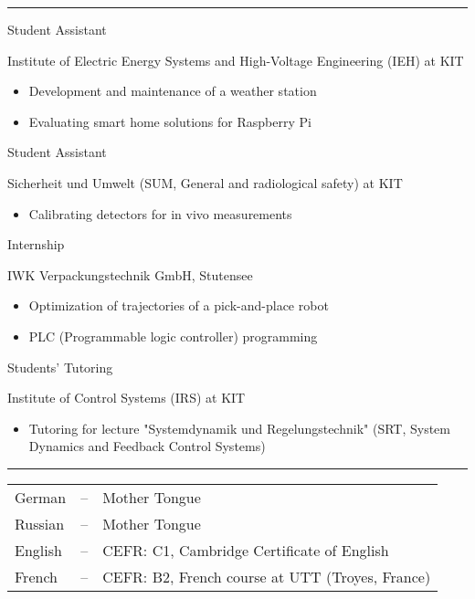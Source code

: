 \documentclass[a4paper,10pt]{article}
\newlength{\cvcolumngapwidth}
\newlength{\cvleftcolumnwidth}
\newlength{\cvrightcolumnwidth}
\newcommand{\cvsectionstyle}[1]{{\normalsize\textcolor{cvsectioncolor}{#1}}}
\newcommand{\cvtitlestyle}[1]{{\large\textcolor{cvtitlecolor}{#1}}}
\newcommand{\cvdurationstyle}[1]{{\small\textcolor{cvdurationcolor}{#1}}}
\newcommand{\cvheadingstyle}[1]{{\normalsize\textcolor{cvheadingcolor}{#1}}}
\newlength{\cvafteritemskipamount}
\newlength{\cvaftersectionskipamount}
\newlength{\cvbetweensectionandheadingextraskipamount}
\newlength{\cvaftertitleskipamount}
\newlength{\cvparskip}
\newcommand{\cvsection}[1]{
    \begin{minipage}[t][][b]{\cvleftcolumnwidth}
        \raggedleft\cvsectionstyle{#1}
    \end{minipage}%
    \hspace{\cvcolumngapwidth}%
    \begin{minipage}[t]{\cvrightcolumnwidth}
        \textcolor{cvrulecolor}{\rule{\cvrightcolumnwidth}{0.3mm}}
    \end{minipage}

    \vspace{\cvaftersectionskipamount}
}
\newcommand{\cvitem}[2]{
    \begin{minipage}[t]{\cvleftcolumnwidth}
    \strut\vspace*{-\baselineskip}\newline %
    \raggedleft #1
    \end{minipage}%
    \hspace{\cvcolumngapwidth}%
    \begin{minipage}[t]{\cvrightcolumnwidth}
        \setlength{\parskip}{\cvparskip}
        \strut\vspace*{-\baselineskip}\newline #2 %
    \end{minipage}

    \vspace{\cvafteritemskipamount}
}
\newcommand{\cvtitle}[1]{
    \cvtitlestyle{#1}

    \vspace{\cvaftertitleskipamount}
    \vspace{-\cvparskip}
}
\begin{document}
\cvsection{WORK EXPERIENCE}

\cvitem{\cvdurationstyle{May 2017 -- now}}{\cvtitle{Student Assistant}
    Institute of Electric Energy Systems and High-Voltage Engineering (IEH) at KIT
    \begin{itemize}[leftmargin=*]
        \item Development and maintenance of a weather station
        \item Evaluating smart home solutions for Raspberry Pi
    \end{itemize}
}

\cvitem{\cvdurationstyle{October 2018 -- December 2019}}{\cvtitle{Student Assistant}
	Sicherheit und Umwelt (SUM, General and radiological safety) at KIT
	\begin{itemize}[leftmargin=*]
		\item Calibrating detectors for in vivo measurements
	\end{itemize}
}

\cvitem{\cvdurationstyle{April 2018 -- July 2018}}{\cvtitle{Internship}
    IWK Verpackungstechnik GmbH, Stutensee
    \begin{itemize}[leftmargin=*]
        \item Optimization of trajectories of a pick-and-place robot
        \item PLC (Programmable logic controller) programming
    \end{itemize}
}

\cvitem{\cvdurationstyle{April 2018 -- July 2018}}{\cvtitle{Students' Tutoring}
    Institute of Control Systems (IRS) at KIT
    \begin{itemize}[leftmargin=*]
        \item Tutoring for lecture "Systemdynamik und Regelungstechnik" (SRT, System Dynamics and Feedback Control Systems)
    \end{itemize}
}

\newpage
\cvsection{SKILLS}

\cvitem{\cvheadingstyle{Languages}}{
    \hspace*{-2mm}\begin{tabular}{lcl}
    German  & -- & Mother Tongue \\
    Russian & -- & Mother Tongue \\
    English & -- & CEFR: C1, Cambridge Certificate of English \\
    French & -- & CEFR: B2, French course at UTT (Troyes, France) \\
    \end{tabular}
}
\end{document}
